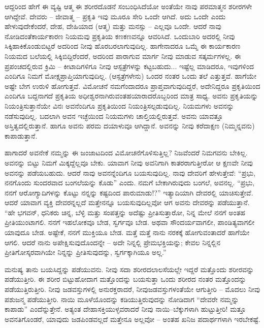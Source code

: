 ಆದ್ದರಿಂದ ಹೇಗೆ ಈ ವ್ಯಷ್ಟಿ ಆತ್ಮ ಈ ಶರೀರದೊಡನೆ ಸಂಬಂಧಿಸಿದೆಯೋ ಅಂತೆಯೇ ನಾವು ಪರಮಾತ್ಮನ ಶರೀರಗಳೇ ಆಗಿದ್ದೇವೆ. ದೇವರು – ಜೀವಾತ್ಮ – ಪ್ರಕೃತಿ ಇವು ಮೂರೂ ಸೇರಿ ಒಂದೇ ಆಗಿದೆ. ಅದು ಒಂದೇ ಎಂದು ಹೇಳುವುದೇಕೆಂದರೆ, ದೇಹ, ದೇಹಿಯಾದ (ಆತ್ಮ) ಮತ್ತು ಮನಸ್ಸು – ಎಲ್ಲವೂ ಒಂದೇ. ಆದರೆ ನಾವು ನೋಡಿದಂತೆ\break ಕಾರ್ಯಕಾರಣ ನಿಯಮವು ಪ್ರಕೃತಿಯ ಕಣಕಣವನ್ನೂ ಆವರಿಸಿದೆ. ಒಂದುಬಾರಿ ಅದರಲ್ಲಿ ನೀವು ಸಿಕ್ಕಿಹಾಕಿಕೊಂಡುಬಿಟ್ಟರೆ ಅದರಿಂದ ನೀವು ಹೊರಬರಲಾಗುವುದಿಲ್ಲ. ಹಾಗೇನಾದರೂ ಒಮ್ಮೆ ಈ ಕಾರ್ಯಕಾರಣ ನಿಯಮದ ಬಲೆಯಲ್ಲಿ ಸಿಕ್ಕಿಬಿದ್ದಿರೆಂದರೆ, ಅದರಿಂದ ಪಾರಾಗುವ ಮಾರ್ಗ ನೀವು ಮಾಡುವ ಸತ್ಕರ್ಮಗಳಲ್ಲ. ಈ ಪ್ರಪಂಚದಲ್ಲಿರುವ ಕ್ರಿಮಿ – ಕೀಟಾದಿಗಳಿಗೂ ನೀವು ಆಸ್ಪತ್ರೆಗಳನ್ನು ಕಟ್ಟಬಹುದು... ಇಷ್ಟೆಲ್ಲ ಮಾಡಿದರೂ, ಇವುಗಳಿಂದ ಎಂದಿಗೂ ನಿಮಗೆ ಮೋಕ್ಷಪ್ರಾಪ್ತಿಯಾಗುವುದಿಲ್ಲ. (ಆಸ್ಪತ್ರೆಗಳೇನು) ಒಂದರ ನಂತರ ಒಂದು ತಲೆ ಎತ್ತುತ್ತವೆ. ಹಾಗೆಯೇ ಅಷ್ಟೇ ಬೇಗ ಉರುಳಿ ಹೋಗುತ್ತವೆ. ವಿಮೋಚನೆ ನಮಗೆಂದಾದರೂ ಪ್ರಾಪ್ತವಾಗುವುದಿದ್ದರೆ, ಅದೇನಿದ್ದರೂ ಪ್ರಕೃತಿಯಿಂದ ಎಂದಿಗೂ ಬದ್ದನಾಗದೆ ಪ್ರಕೃತಿಯ ಅಧೀಶ್ವರನಾಗಿರುವಂತಹ\break ಯಾರಾದರೊಬ್ಬರಿಂದ ಮಾತ್ರ ಸಾಧ್ಯ. ಅವನು ಪ್ರಕೃತಿಯನ್ನು ನಿಯಂತ್ರಿಸುತ್ತಾನೆಯೇ ವಿನಃ ಅವನೆಂದಿಗೂ ಪ್ರಕೃತಿಯಿಂದ ನಿಯಂತ್ರಿಸಲ್ಪಡುವುದಿಲ್ಲ. ನಿಯಮಗಳು ಅವನನ್ನು ನಡೆಸುವುದಿಲ್ಲ. ಬದಲಾಗಿ ಅವನ ಇಚ್ಛೆಯಿಂದ ನಿಯಮಗಳು ಚಾಲ್ತಿಯಲ್ಲಿರುತ್ತವೆ. ಅವನು ಯಾವತ್ತೂ ಅಸ್ತಿತ್ವದಲ್ಲಿರುತ್ತಾನೆ. ಹಾಗೂ ಅವನು ಪರಮ ದಯಾಳುವೂ ಆಗಿದ್ದಾನೆ. ಅವನನ್ನು ನೀವು ಕರೆದಾಕ್ಷಣ (ನಿಮ್ಮನ್ನವನು) ಕಾಪಾಡುತ್ತಾನೆ.

ಹಾಗಾದರೆ ಅವನೇಕೆ ನಮ್ಮನ್ನು ಈ ಜಂಜಾಟದಿಂದ ವಿಮೋಚನೆಗೊಳಿಸುತ್ತಿಲ್ಲ? ನಿಜವೆಂದರೆ ನಿಮಗವನು ಬೇಕಿಲ್ಲ. ಅವನನ್ನು ಬಿಟ್ಟು ನಿಮಗೆ ಮಿಕ್ಕದ್ದೆಲ್ಲವೂ ಬೇಕು. ಯಾವಾಗ ನೀವು ಅವನಿಗಾಗಿ ಕಾತರರಾಗುತ್ತೀರೋ ಆ ಕ್ಷಣವೇ ನೀವು ಅವನನ್ನು ಪಡೆಯಬಹುದು. ಆದರೆ ನಾವು ಅವನನ್ನೆಂದಿಗೂ ಬಯಸುವುದಿಲ್ಲ. ನಾವು ದೇವರಿಗೆ ಹೇಳುತ್ತೇವೆ: “ಪ್ರಭು, ನನಗೊಂದು ಸುಂದರವಾದ ಬಂಗಲೆಯನ್ನು ಕೊಡು” ಎಂದು. ನಮಗೆ ಬೇಕಾಗಿರುವುದು ಬಂಗಲೆ, ಅವನಲ್ಲ. “ಪ್ರಭು, ನನಗೆ ಆರೋಗ್ಯಾದಿಗಳನ್ನು ಕೊಟ್ಟು ನನ್ನನ್ನು ಕಷ್ಟದಿಂದ ಪಾರುಮಾಡು!?” ಇತ್ಯಾದಿಯಾಗಿ ದೇವರಲ್ಲಿ ಯಾಚಿಸುತ್ತೇವೆ. ಆದರೆ ಯಾವಾಗ ವ್ಯಕ್ತಿ ದೇವರನ್ನಲ್ಲದೆ ಮತ್ತೇನನ್ನೂ ಬಯಸುವುದಿಲ್ಲವೋ ಆಗ ಅವನು ದೇವರನ್ನು ಪಡೆಯುತ್ತಾನೆ. “ಹೇ ಭಗವನ್, ಧನಿಕರು ಚಿನ್ನ, ಬೆಳ್ಳಿ ಮತ್ತು ಸಂಪತ್ತನ್ನು ಅದೆಷ್ಟು ಪ್ರೀತಿಸುತ್ತಾರೋ, ನಿನ್ನ ಮೇಲೆ ನನಗೆ ಅಂತಹ ಪ್ರೀತಿಯುಂಟಾಗಲಿ. ನನಗೆ ಇಹಲೋಕವೂ ಬೇಡ, ಸ್ವರ್ಗವೂ ಬೇಡ. ಅಥವಾ ಸೌಂದರ್ಯವಾಗಲೀ, ಪಾಂಡಿತ್ಯವಾಗಲೀ ಯಾವುದೂ ಬೇಡ. ಅಷ್ಟೇಕೆ, ನನಗೆ ಮುಕ್ತಿಯೂ ಬೇಡ. ಮತ್ತೆ ಮತ್ತೆ ನಾನು ನರಕಕ್ಕೆ ಹೋಗುವಂತಾದರೆ ಹಾಗೆಯೇ ಆಗಲಿ. ಆದರೆ ನಾನು ಅಪೇಕ್ಷಿಸುವುದೊಂದನ್ನೇ – ಅದೇ ನಿನ್ನಲ್ಲಿ ಪ್ರೇಮಭಕ್ತಿಯನ್ನು; ಕೇವಲ ನಿನ್ನಲ್ಲಿನ ಪ್ರೀತಿಗೋಸ್ಕರವಾಗಿಯೇ ನಿನ್ನನ್ನು ಪ್ರೀತಿಸುವುದನ್ನು, ಸ್ವರ್ಗಕ್ಕಾಗಿಯೂ ಅಲ್ಲ.''

ಮನುಷ್ಯ ತಾನು ಬಯಸಿದ್ದನ್ನು ಪಡೆಯುವನು. ನೀವು ಸದಾ ಶರೀರದ\break ಲಾಲಸೆಯಲ್ಲೇ ಇದ್ದರೆ ಮತ್ತೊಂದು ಶರೀರವನ್ನು ಪಡೆಯುತ್ತೀರಿ. ಈ ಶರೀರ ಬಿಟ್ಟುಹೋದಾಗ ಮತ್ತೊಂದನ್ನು ಬಯಸುತ್ತಾ ಒಂದು ಶರೀರದ ನಂತರ ಮತ್ತೊಂದನ್ನು ಪಡೆಯುತ್ತಿರುತ್ತೀರಿ. ನೀವು ಜಡವಸ್ತುಗಳಲ್ಲಿ ಅನುರಕ್ತರಾದರೆ, ನೀವು\break ಜಡವಸ್ತುಗಳಂತೆಯೇ ಆಗುತ್ತೀರಿ – ಮೊದಲು ನೀವು ಪಶುಜನ್ಮ ಪಡೆಯುತ್ತೀರಿ. ನಾಯಿ ಮೂಳೆಯೊಂದನ್ನು ಕಡಿಯುತ್ತಿರುವುದನ್ನು ನೋಡಿದಾಗ “ದೇವರೇ ನಮ್ಮನ್ನು ಕಾಪಾಡು'' ಎಂದೆನ್ನುತ್ತೇನೆ. ಅತ್ಯಂತ ದೇಹಾಸಕ್ತಿಯುಳ್ಳವರಾದರೆ ನೀವು ನಾಯಿ–ಬೆಕ್ಕುಗಳಾಗಿ ಹುಟ್ಟುತ್ತೀರಿ! ಮತ್ತೂ ಅವನತಿಗೊಂಡರೆ, ಯಾವುದು ಜಡಪಿಂಡವಲ್ಲದೆ ಮತ್ತೇನೂ ಅಲ್ಲವೋ – ಅಂತಹ ಖನಿಜ ಪದಾರ್ಥಗಳಾಗಿ ಇರಬೇಕಷ್ಟೆ.

